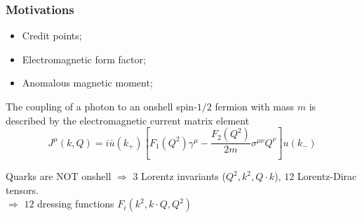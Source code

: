  \begin{frame}\frametitle{Motivations}


	
\begin{itemize}
	\item Credit points;
	\item Electromagnetic form factor;
	\item Anomalous magnetic moment; 
\end{itemize}
\vspace{2mm}



The coupling of a photon to an onshell spin-$1/2$ fermion with mass $m$ is described by the electromagnetic
current matrix element
\begin{equation}
	J^\mu(k, Q)=i\bar{u}(k_+)\left[F_1(Q^2)\gamma^\mu-\frac{F_2(Q^2)}{2m}\sigma^{\mu\nu}Q^\nu\right]u(k_-)
\end{equation}

Quarks are NOT onshell $\Rightarrow$ $3$ Lorentz invariants ($Q^2, k^2, Q\cdot k$), $12$ Lorentz-Dirac tensors.\\
\vspace{3mm}
$\Rightarrow$ $12$ dressing functions $F_i(k^2, k\cdot Q, Q^2)$

\end{frame}

\endinput
